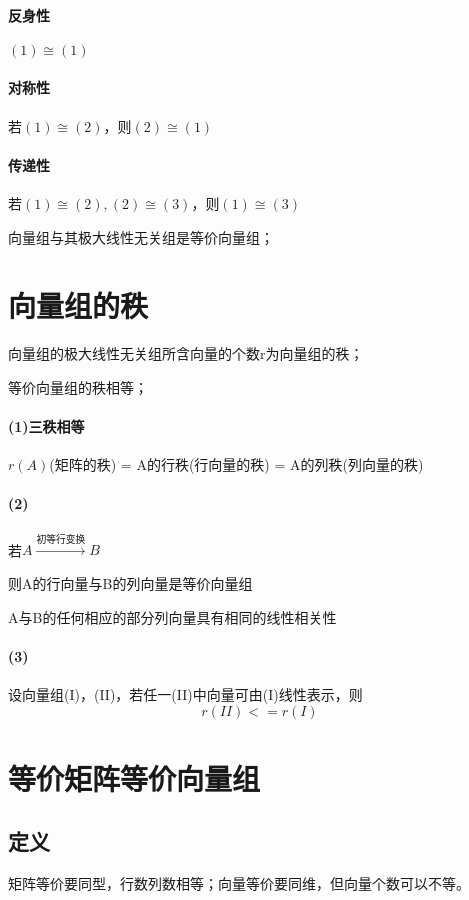 \paragraph{反身性}
\((1) \cong (1)\)

\paragraph{对称性}
若\((1) \cong (2)\)，则\((2) \cong (1)\)

\paragraph{传递性}
若\((1) \cong (2), (2) \cong (3)\)，则\((1) \cong (3)\)

向量组与其极大线性无关组是等价向量组；


\section{向量组的秩}
向量组的极大线性无关组所含向量的个数r为向量组的秩；

等价向量组的秩相等；

\paragraph{(1)三秩相等}
\(r(A)\)(矩阵的秩) = A的行秩(行向量的秩) = A的列秩(列向量的秩)

\paragraph{(2)}
若\(A \xrightarrow{\text{初等行变换}} B\)

则A的行向量与B的列向量是等价向量组

A与B的任何相应的部分列向量具有相同的线性相关性

\paragraph{(3)}
设向量组(I)，(II)，若任一(II)中向量可由(I)线性表示，则
\[r(II) <= r(I)\]


\section{等价矩阵等价向量组}

\subsection{定义}
矩阵等价要同型，行数列数相等；向量等价要同维，但向量个数可以不等。

